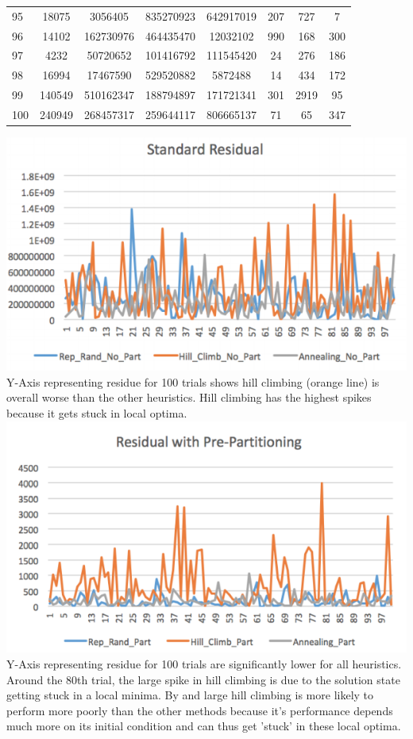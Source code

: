 \documentclass[11pt]{article}
\begin{document}
\begin{table}[h!]
\begin{tabular}{p{1cm}|C| C | C | C | C | C | C}
95 & 18075 & 3056405 & 835270923 & 642917019 & 207 & 727 & 7 \\ 
96 & 14102 & 162730976 & 464435470 & 12032102 & 990 & 168 & 300 \\ 
97 & 4232 & 50720652 & 101416792 & 111545420 & 24 & 276 & 186 \\ 
98 & 16994 & 17467590 & 529520882 & 5872488 & 14 & 434 & 172 \\ 
99 & 140549 & 510162347 & 188794897 & 171721341 & 301 & 2919 & 95 \\ 
100 & 240949 & 268457317 & 259644117 & 806665137 & 71 & 65 & 347 \\
\end{tabular}
\end{table}

\includegraphics{residueresults} \\
Y-Axis representing residue for 100 trials shows hill climbing (orange line) is overall worse than the other heuristics. Hill climbing has the highest spikes because it gets stuck in local optima.\\

\includegraphics{residualprepart} \\
Y-Axis representing residue for 100 trials are significantly lower for all heuristics. Around the 80th trial, the large spike in hill climbing is due to the solution state getting stuck in a local minima. By and large hill climbing is more likely to perform more poorly than the other methods because it’s performance depends much more on its initial condition and can thus get ’stuck’ in these local optima.\\
\end{document}
